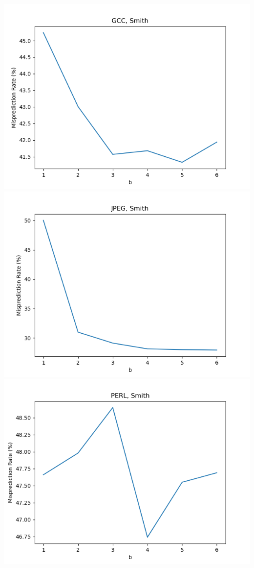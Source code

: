 \documentclass{article}
\begin{document}
    \begin{center}

        \includegraphics[scale=0.83]{../graph_logs/GCC_Smith.png}
        \includegraphics[scale=0.83]{../graph_logs/JPEG_Smith.png}
        \includegraphics[scale=0.83]{../graph_logs/PERL_Smith.png}

    \end{center}
\end{document}
